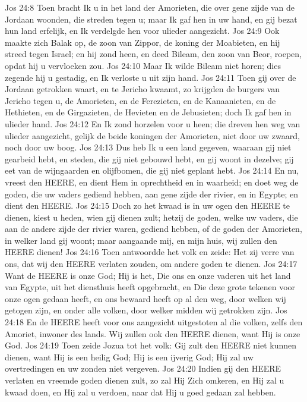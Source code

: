 Jos 24:8  Toen bracht Ik u in het land der Amorieten, die over gene zijde van de Jordaan woonden, die streden tegen u; maar Ik gaf hen in uw hand, en gij bezat hun land erfelijk, en Ik verdelgde hen voor ulieder aangezicht.
Jos 24:9  Ook maakte zich Balak op, de zoon van Zippor, de koning der Moabieten, en hij streed tegen Israel; en hij zond heen, en deed Bileam, den zoon van Beor, roepen, opdat hij u vervloeken zou.
Jos 24:10  Maar Ik wilde Bileam niet horen; dies zegende hij u gestadig, en Ik verloste u uit zijn hand.
Jos 24:11  Toen gij over de Jordaan getrokken waart, en te Jericho kwaamt, zo krijgden de burgers van Jericho tegen u, de Amorieten, en de Ferezieten, en de Kanaanieten, en de Hethieten, en de Girgazieten, de Hevieten en de Jebusieten; doch Ik gaf hen in ulieder hand.
Jos 24:12  En Ik zond horzelen voor u heen; die dreven hen weg van ulieder aangezicht, gelijk de beide koningen der Amorieten, niet door uw zwaard, noch door uw boog.
Jos 24:13  Dus heb Ik u een land gegeven, waaraan gij niet gearbeid hebt, en steden, die gij niet gebouwd hebt, en gij woont in dezelve; gij eet van de wijngaarden en olijfbomen, die gij niet geplant hebt.
Jos 24:14  En nu, vreest den HEERE, en dient Hem in oprechtheid en in waarheid; en doet weg de goden, die uw vaders gediend hebben, aan gene zijde der rivier, en in Egypte; en dient den HEERE.
Jos 24:15  Doch zo het kwaad is in uw ogen den HEERE te dienen, kiest u heden, wien gij dienen zult; hetzij de goden, welke uw vaders, die aan de andere zijde der rivier waren, gediend hebben, of de goden der Amorieten, in welker land gij woont; maar aangaande mij, en mijn huis, wij zullen den HEERE dienen!
Jos 24:16  Toen antwoordde het volk en zeide: Het zij verre van ons, dat wij den HEERE verlaten zouden, om andere goden te dienen.
Jos 24:17  Want de HEERE is onze God; Hij is het, Die ons en onze vaderen uit het land van Egypte, uit het diensthuis heeft opgebracht, en Die deze grote tekenen voor onze ogen gedaan heeft, en ons bewaard heeft op al den weg, door welken wij getogen zijn, en onder alle volken, door welker midden wij getrokken zijn.
Jos 24:18  En de HEERE heeft voor ons aangezicht uitgestoten al die volken, zelfs den Amoriet, inwoner des lands. Wij zullen ook den HEERE dienen, want Hij is onze God.
Jos 24:19  Toen zeide Jozua tot het volk: Gij zult den HEERE niet kunnen dienen, want Hij is een heilig God; Hij is een ijverig God; Hij zal uw overtredingen en uw zonden niet vergeven.
Jos 24:20  Indien gij den HEERE verlaten en vreemde goden dienen zult, zo zal Hij Zich omkeren, en Hij zal u kwaad doen, en Hij zal u verdoen, naar dat Hij u goed gedaan zal hebben.
